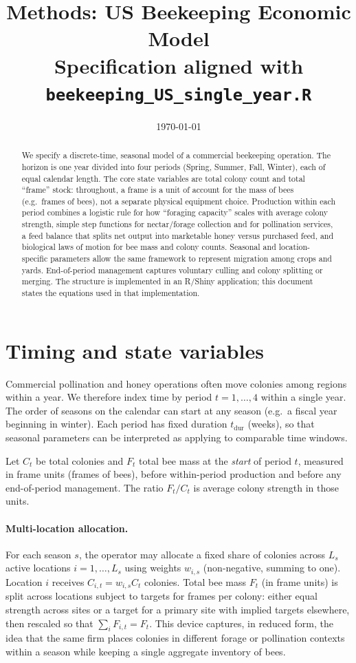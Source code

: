 \documentclass[11pt]{article}
\title{Methods: US Beekeeping Economic Model\\{\large Specification aligned with \texttt{beekeeping\_US\_single\_year.R}}}
\author{}
\date{\today}
\begin{document}
\maketitle

\begin{abstract}
\noindent
We specify a discrete-time, seasonal model of a commercial beekeeping operation. The horizon is one year divided into four periods (Spring, Summer, Fall, Winter), each of equal calendar length. The core state variables are total colony count and total ``frame'' stock: throughout, a frame is a unit of account for the mass of bees (e.g.\ frames of bees), not a separate physical equipment choice. Production within each period combines a logistic rule for how ``foraging capacity'' scales with average colony strength, simple step functions for nectar/forage collection and for pollination services, a feed balance that splits net output into marketable honey versus purchased feed, and biological laws of motion for bee mass and colony counts. Seasonal and location-specific parameters allow the same framework to represent migration among crops and yards. End-of-period management captures voluntary culling and colony splitting or merging. The structure is implemented in an R/Shiny application; this document states the equations used in that implementation.
\end{abstract}

\section{Timing and state variables}

Commercial pollination and honey operations often move colonies among regions within a year. We therefore index time by period $t=1,\ldots,4$ within a single year. The order of seasons on the calendar can start at any season (e.g.\ a fiscal year beginning in winter). Each period has fixed duration $t_{\mathrm{dur}}$ (weeks), so that seasonal parameters can be interpreted as applying to comparable time windows.

Let $C_t$ be total colonies and $F_t$ total bee mass at the \emph{start} of period $t$, measured in frame units (frames of bees), before within-period production and before any end-of-period management. The ratio $F_t/C_t$ is average colony strength in those units.

\paragraph{Multi-location allocation.}
For each season $s$, the operator may allocate a fixed share of colonies across $L_s$ active locations $i=1,\ldots,L_s$ using weights $w_{i,s}$ (non-negative, summing to one). Location $i$ receives $C_{i,t}=w_{i,s} C_t$ colonies. Total bee mass $F_t$ (in frame units) is split across locations subject to targets for frames per colony: either equal strength across sites or a target for a primary site with implied targets elsewhere, then rescaled so that $\sum_i F_{i,t}=F_t$. This device captures, in reduced form, the idea that the same firm places colonies in different forage or pollination contexts within a season while keeping a single aggregate inventory of bees.
\end{document}
